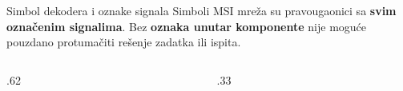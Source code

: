 \begin{frame}[label=03-s007]{Simbol dekodera i oznake signala}
Simboli MSI mreža su pravougaonici sa \textcolor{DEisticanje}{\textbf{svim označenim signalima}}.
Bez \textbf{oznaka unutar komponente} nije moguće pouzdano protumačiti rešenje zadatka ili ispita.
\par\vspace{2mm}
\begingroup
\def\DEgateScale{.62}\def\DEtapDelta{.45}\def\DEnegSOne{2.1}\def\DEnegSZero{1.2}\def\DEbottomFrame{-.75}
\def\DEdekoderY{0.78}
\def\DEcs{0}\def\DEokvir{1}\def\DEnaziv{Dekoder}\def\DEtip{2/4}
\begin{columns}[c,onlytextwidth]
\begin{column}{.62\textwidth}\centering

\end{column}
\begin{column}{.33\textwidth}\centering

\end{column}
\end{columns}
\par\endgroup
\par\par\vspace{1mm}
\end{frame}
